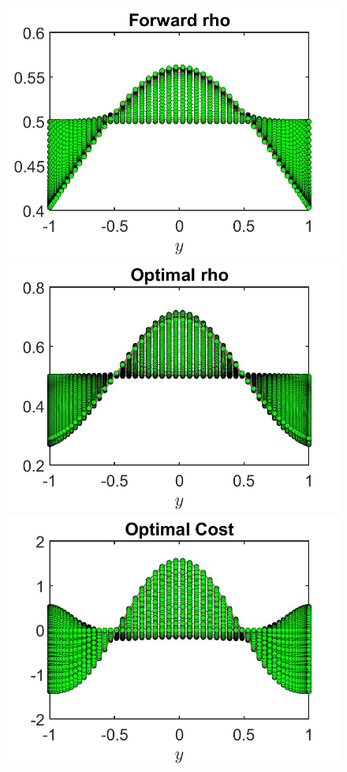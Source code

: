 \documentclass[11pt, a4paper]{article}
\theoremstyle{definition}
\begin{document}
\begin{figure}[h]
	\includegraphics[scale=0.3]{NFrhoFW1.jpg}	
	\includegraphics[scale=0.3]{NFrhoOpt1.jpg}
	\includegraphics[scale=0.3]{NFwOpt1.jpg}

\end{figure}
\end{document}
